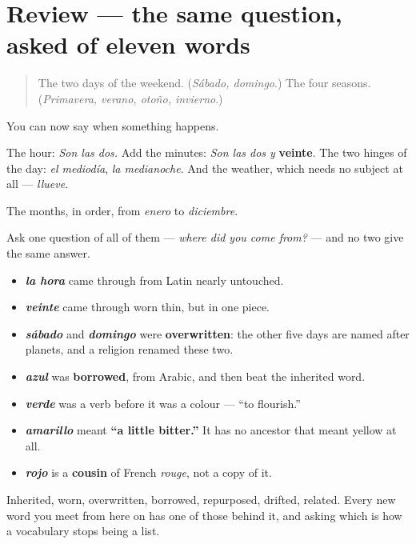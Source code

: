 \section[(review)]{Review — the same question, asked of eleven words}

\label{lesson:ES-C40-repaso-palabras-con-historia}



\begin{quote}
The two days of the weekend. (\emph{Sábado, domingo}.) The four seasons. (\emph{Primavera, verano, otoño, invierno}.)
\end{quote}

\begin{grammarlens}[title={What you've built}]
You can now say when something happens.

The hour: \emph{Son las dos.} Add the minutes: \emph{Son las dos y} \textbf{veinte}. The two hinges of the day: \emph{el mediodía}, \emph{la medianoche}. And the weather, which needs no subject at all — \emph{llueve}.

The months, in order, from \emph{enero} to \emph{diciembre}.
\end{grammarlens}

\begin{culture}
Ask one question of all of them — \emph{where did you come from?} — and no two give the same answer.

\begin{itemize}
\raggedright
  \item \emph{\textbf{la hora}} came through from Latin nearly untouched.
  \item \emph{\textbf{veinte}} came through worn thin, but in one piece.
  \item \emph{\textbf{sábado}} and \emph{\textbf{domingo}} were \textbf{overwritten}: the other five days are named after planets, and a religion renamed these two.
  \item \emph{\textbf{azul}} was \textbf{borrowed}, from Arabic, and then beat the inherited word.
  \item \emph{\textbf{verde}} was a verb before it was a colour — \textquotedblleft{}to flourish.\textquotedblright{}
  \item \emph{\textbf{amarillo}} meant \textbf{\textquotedblleft{}a little bitter.\textquotedblright{}} It has no ancestor that meant yellow at all.
  \item \emph{\textbf{rojo}} is a \textbf{cousin} of French \emph{rouge}, not a copy of it.
\end{itemize}

Inherited, worn, overwritten, borrowed, repurposed, drifted, related. Every new word you meet from here on has one of those behind it, and asking which is how a vocabulary stops being a list.
\end{culture}

